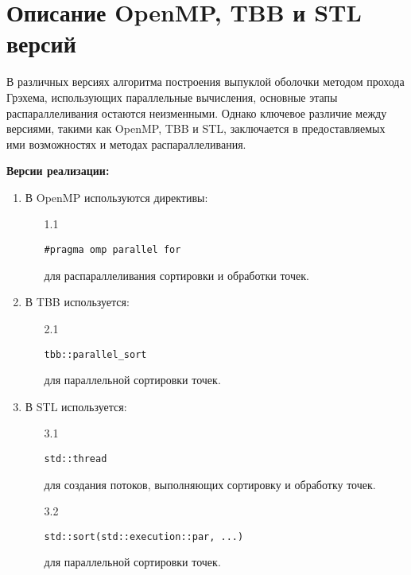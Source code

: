\documentclass{report}
\begin{document}
\newpage

\section*{Описание OpenMP, TBB и STL версий}
\par В различных версиях алгоритма построения выпуклой оболочки методом прохода Грэхема, использующих параллельные вычисления, основные этапы распараллеливания остаются неизменными. Однако ключевое различие между версиями, такими как OpenMP, TBB и STL, заключается в предоставляемых ими возможностях и методах распараллеливания.
\par \textbf{Версии реализации:}
\begin{enumerate}
\item В OpenMP используются директивы:
\vspace{0.5em}
\begin{enumerate}
\item[1.1] \begin{verbatim}
#pragma omp parallel for
\end{verbatim}
для распараллеливания сортировки и обработки точек.
\end{enumerate}
\item В TBB используется:
\vspace{0.5em}
\begin{enumerate}
\item[2.1] \begin{verbatim}
tbb::parallel_sort
\end{verbatim}
для параллельной сортировки точек.
\end{enumerate}
\item В STL используется:
\vspace{0.5em}
\begin{enumerate}
\item[3.1] \begin{verbatim}
std::thread
\end{verbatim}
для создания потоков, выполняющих сортировку и обработку точек.
\item[3.2] \begin{verbatim}
std::sort(std::execution::par, ...)
\end{verbatim}
для параллельной сортировки точек.
\end{enumerate}
\end{enumerate}

\newpage

\end{document}
